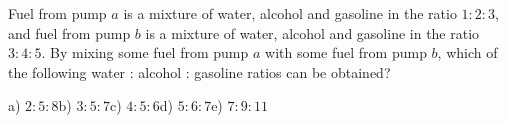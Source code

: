 Fuel from pump $a$ is a mixture of water, alcohol and gasoline in the ratio $1:2:3$, and fuel from pump $b$ is a mixture of water, alcohol and gasoline in the ratio $3:4:5$. By mixing some fuel from pump $a$ with some fuel from pump $b$, which of the following water : alcohol : gasoline ratios can be obtained?

a) $2:5:8$\qquad b) $3:5:7$\qquad c) $4:5:6$\qquad d) $5:6:7$\qquad e) $7:9:11$
